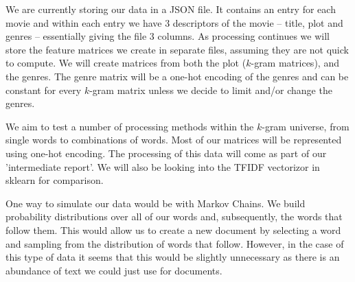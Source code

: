 \documentclass[12pt]{article}
\begin{document}
We are currently storing our data in a JSON file. It contains an entry for each movie and within each entry we have 3 descriptors of the movie -- title, plot and genres -- essentially giving the file 3 columns. As processing continues we will store the feature matrices we create in separate files, assuming they are not quick to compute. We will create matrices from both the plot ($k$-gram matrices), and the genres. The genre matrix will be a one-hot encoding of the genres and can be constant for every $k$-gram matrix unless we decide to limit and/or change the genres.


We aim to test a number of processing methods within the $k$-gram universe, from single words to combinations of words. Most of our matrices will be represented using one-hot encoding. The processing of this data will come as part of our 'intermediate report'. We will also be looking into the TFIDF vectorizor in sklearn for comparison.

One way to simulate our data would be with Markov Chains. We build probability distributions over all of our words and, subsequently, the words that follow them. This would allow us to create a new document by selecting a word and sampling from the distribution of words that follow. However, in the case of this type of data it seems that this would be slightly unnecessary as there is an abundance of text we could just use for documents.
\end{document}
